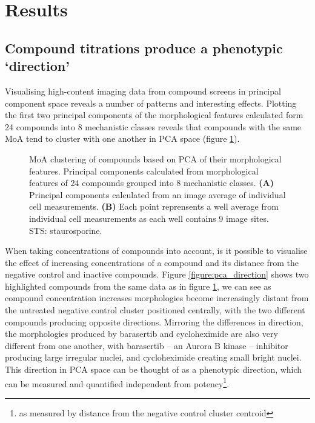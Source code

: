 \documentclass[a4paper,11pt,twoside,openright]{scrbook}
\begin{document}




\section{Results}

\subsection{Compound titrations produce a phenotypic `direction'}
 
Visualising high-content imaging data from compound screens in principal component space reveals a number of patterns and interesting effects.
Plotting the first two principal components of the morphological features calculated form 24 compounds into 8 mechanistic classes reveals that compounds with the same MoA tend to cluster with one another in PCA space (figure \ref{figure:pca_clustering}).

\begin{figure}
    \captionsetup{width=0.8\textwidth}
    \caption[PCA compound clustering based on MoA]{
MoA clustering of compounds based on PCA of their morphological features. 
Principal components calculated from morphological features of 24 compounds grouped into 8 mechanistic classes.
\textbf{(A)} Principal components calculated from an image average of individual cell measurements.
\textbf{(B)} Each point reprensents a well average from individual cell measurements as each well contains 9 image sites.
STS: staurosporine.
}
    
    \label{figure:pca_clustering}
\end{figure}

When taking concentrations of compounds into account, is it possible to visualise the effect of increasing concentrations of a compound and its distance from the negative control and inactive compounds.
Figure \ref{figure:pca_direction} shows two highlighted compounds from the same data as in figure \ref{figure:pca_clustering}, we can see as compound concentration increases morphologies become increasingly distant from the untreated negative control cluster positioned centrally, with the two different compounds producing opposite directions.
Mirroring the differences in direction, the morphologies produced by barasertib and cycloheximide are also very different from one another, with barasertib -- an Aurora B kinase -- inhibitor producing large irregular nuclei, and cycloheximide creating small bright nuclei.
This direction in PCA space can be thought of as a phenotypic direction, which can be measured and quantified independent from potency\footnote{as measured by distance from the negative control cluster centroid}.
\end{document}
